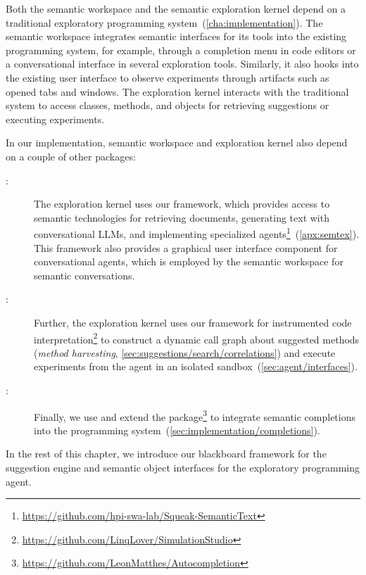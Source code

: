 Both the semantic workspace and the semantic exploration kernel depend on a traditional exploratory programming system~(\cref{cha:implementation}).
The semantic workspace integrates semantic interfaces for its tools into the existing programming system, for example, through a completion menu in code editors or a conversational interface in several exploration tools.
Similarly, it also hooks into the existing user interface to observe experiments through artifacts such as opened tabs and windows.
The exploration kernel interacts with the traditional system to access classes, methods, and objects for retrieving suggestions or executing experiments.

In our implementation, semantic workspace and exploration kernel also depend on a couple of other packages:

\begin{description}
	\item[\semtex:]
	The exploration kernel uses our \semtex framework, which provides access to semantic technologies for retrieving documents, generating text with conversational LLMs, and implementing specialized agents\footnote{\url{https://github.com/hpi-swa-lab/Squeak-SemanticText}}~(\cref{apx:semtex}).
	This framework also provides a graphical user interface component for conversational agents, which is employed by the semantic workspace for semantic conversations.

	\item[:]
	Further, the exploration kernel uses our  framework for instrumented code interpretation\footnote{\url{https://github.com/LinqLover/SimulationStudio}} to construct a dynamic call graph about suggested methods (\emph{method harvesting}, \cref{sec:suggestions/search/correlations}) and execute experiments from the agent in an isolated sandbox~(\cref{sec:agent/interfaces}).

	\item[:]
	Finally, we use and extend the  package\footnote{\url{https://github.com/LeonMatthes/Autocompletion}} to integrate semantic completions into the programming system~(\cref{sec:implementation/completions}).
\end{description}

In the rest of this chapter, we introduce our blackboard framework for the suggestion engine and semantic object interfaces for the exploratory programming agent.
